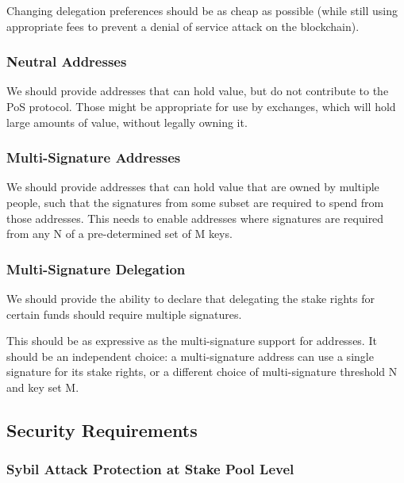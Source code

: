 \documentclass[11pt,a4paper,dvipsnames,twosided]{article}
\begin{document}
Changing delegation preferences should be as cheap as possible (while
still using appropriate fees to prevent a denial of service attack on
the blockchain).

\subsubsection{Neutral Addresses}
\label{neutral-addresses}

We should provide addresses that can hold value, but do not contribute
to the PoS protocol. Those might be appropriate for use by exchanges,
which will hold large amounts of value, without legally owning it.

\subsubsection{Multi-Signature Addresses}
\label{multi-sig-addresses}

We should provide addresses that can hold value that are owned by
multiple people, such that the signatures from some subset are required
to spend from those addresses. This needs to enable addresses where
signatures are required from any N of a pre-determined set of M keys.

\subsubsection{Multi-Signature Delegation}
\label{multi-sig-delegation}

We should provide the ability to declare that delegating the stake
rights for certain funds should require multiple signatures.

This should be as expressive as the multi-signature support for
addresses. It should be an independent choice: a multi-signature
address can use a single signature for its stake rights, or a
different choice of multi-signature threshold N and key set M.

\subsection{Security Requirements}
\label{security-requirements}

\subsubsection{Sybil Attack Protection at Stake Pool Level}
\label{sybil-attack-protection-at-stake-pool-level}
\end{document}
